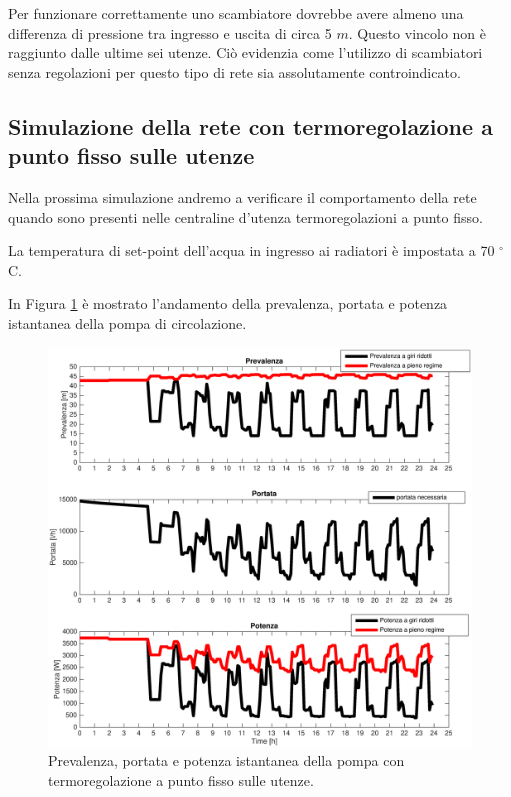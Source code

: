 \documentclass[laurea,oneside,11pt]{USiena_tesiLM3}
\begin{document}
Per funzionare correttamente uno scambiatore dovrebbe avere almeno una differenza di pressione tra ingresso e uscita di circa 5 $m$. Questo vincolo non è raggiunto dalle ultime sei utenze. 
Ciò evidenzia come l'utilizzo di scambiatori senza regolazioni per questo tipo di rete sia assolutamente controindicato.


\subsection{Simulazione della rete con termoregolazione a punto fisso sulle utenze}
Nella prossima simulazione andremo a verificare il comportamento della rete quando sono presenti nelle centraline d'utenza termoregolazioni a punto fisso. 

La temperatura di set-point dell'acqua in ingresso ai radiatori è impostata a 70 $^{\circ}$C.

In Figura \ref{fig:sim_regmandata} è mostrato l'andamento della prevalenza, portata e potenza istantanea della pompa di circolazione.

\begin{figure}[!ht]
\centering
\includegraphics[width=\textwidth]{figure/sim_regmandata} 
\caption{Prevalenza, portata e potenza istantanea della pompa con termoregolazione a punto fisso sulle utenze. }
\label{fig:sim_regmandata}
\end{figure}
\end{document}
